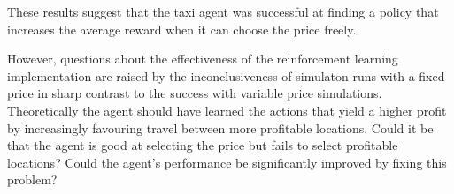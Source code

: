 These results suggest that the taxi agent was successful at finding a policy
that increases the average reward when it can choose the price freely. 

However, questions about the effectiveness of the reinforcement learning
implementation are raised by the inconclusiveness of simulaton runs with a
fixed price in sharp contrast to the success with variable price simulations.
Theoretically the agent should have learned the actions that yield a higher
profit by increasingly favouring travel between more profitable locations.
Could it be that the agent is good at selecting the price but fails to select
profitable locations? Could the agent's performance be significantly improved
by fixing this problem?
